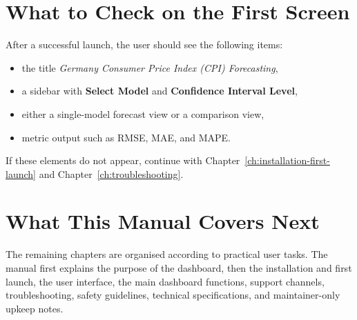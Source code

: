 \section{What to Check on the First Screen}

After a successful launch, the user should see the following items:

\begin{itemize}
    \item the title \textit{Germany Consumer Price Index (CPI) Forecasting},
    \item a sidebar with \textbf{Select Model} and \textbf{Confidence Interval Level},
    \item either a single-model forecast view or a comparison view,
    \item metric output such as RMSE, MAE, and MAPE.
\end{itemize}

If these elements do not appear, continue with Chapter~\ref{ch:installation-first-launch} and Chapter~\ref{ch:troubleshooting}.

\section{What This Manual Covers Next}

The remaining chapters are organised according to practical user tasks. The manual first explains the purpose of the dashboard, then the installation and first launch, the user interface, the main dashboard functions, support channels, troubleshooting, safety guidelines, technical specifications, and maintainer-only upkeep notes.
